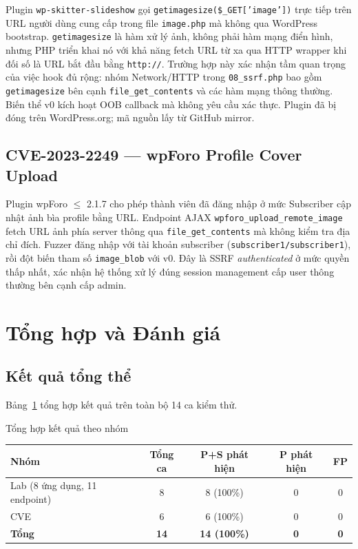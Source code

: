 Plugin \texttt{wp-skitter-slideshow} gọi
\texttt{getimagesize(\$\_GET['image'])} trực tiếp trên URL người dùng
cung cấp trong file \texttt{image.php} mà không qua WordPress bootstrap.
\texttt{getimagesize} là hàm xử lý ảnh, không phải hàm mạng điển hình,
nhưng PHP triển khai nó với khả năng fetch URL từ xa qua HTTP wrapper
khi đối số là URL bắt đầu bằng \texttt{http://}. Trường hợp này xác
nhận tầm quan trọng của việc hook đủ rộng: nhóm Network/HTTP trong
\texttt{08\_ssrf.php} bao gồm \texttt{getimagesize} bên cạnh
\texttt{file\_get\_contents} và các hàm mạng thông thường. Biến thể v0
kích hoạt OOB callback mà không yêu cầu xác thực. Plugin đã bị đóng
trên WordPress.org; mã nguồn lấy từ GitHub mirror.

\subsection{CVE-2023-2249 --- wpForo Profile Cover Upload}

Plugin wpForo $\leq$ 2.1.7 cho phép thành viên đã đăng nhập ở mức
Subscriber cập nhật ảnh bìa profile bằng URL. Endpoint AJAX
\texttt{wpforo\_upload\_remote\_image} fetch URL ảnh phía server thông
qua \texttt{file\_get\_contents} mà không kiểm tra địa chỉ đích. Fuzzer
đăng nhập với tài khoản subscriber (\texttt{subscriber1/subscriber1}),
rồi đột biến tham số \texttt{image\_blob} với v0. Đây là SSRF
\textit{authenticated} ở mức quyền thấp nhất, xác nhận hệ thống xử lý
đúng session management cấp user thông thường bên cạnh cấp admin.

\section{Tổng hợp và Đánh giá}
\label{sec:exp-summary}

\subsection{Kết quả tổng thể}

Bảng~\ref{tab:overall} tổng hợp kết quả trên toàn bộ 14 ca kiểm thử.

\begin{table}[h]{Tổng hợp kết quả theo nhóm}
\label{tab:overall}
\centering
\begin{tabular}{|l|c|c|c|c|}
\hline
\textbf{Nhóm} & \textbf{Tổng ca} & \textbf{P+S phát hiện} & \textbf{P phát hiện} & \textbf{FP} \\
\hline
Lab (8 ứng dụng, 11 endpoint) & 8  & 8 (100\%) & 0 & 0 \\
CVE                            & 6  & 6 (100\%) & 0 & 0 \\
\hline
\textbf{Tổng}                 & \textbf{14} & \textbf{14 (100\%)} & \textbf{0} & \textbf{0} \\
\hline
\end{tabular}
\end{table}

